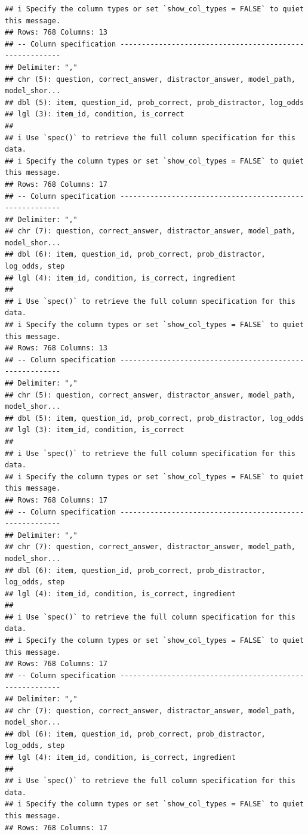 \documentclass[
]{article}
\begin{document}
\begin{verbatim}
## i Specify the column types or set `show_col_types = FALSE` to quiet this message.
## Rows: 768 Columns: 13
## -- Column specification --------------------------------------------------------
## Delimiter: ","
## chr (5): question, correct_answer, distractor_answer, model_path, model_shor...
## dbl (5): item, question_id, prob_correct, prob_distractor, log_odds
## lgl (3): item_id, condition, is_correct
## 
## i Use `spec()` to retrieve the full column specification for this data.
## i Specify the column types or set `show_col_types = FALSE` to quiet this message.
## Rows: 768 Columns: 17
## -- Column specification --------------------------------------------------------
## Delimiter: ","
## chr (7): question, correct_answer, distractor_answer, model_path, model_shor...
## dbl (6): item, question_id, prob_correct, prob_distractor, log_odds, step
## lgl (4): item_id, condition, is_correct, ingredient
## 
## i Use `spec()` to retrieve the full column specification for this data.
## i Specify the column types or set `show_col_types = FALSE` to quiet this message.
## Rows: 768 Columns: 13
## -- Column specification --------------------------------------------------------
## Delimiter: ","
## chr (5): question, correct_answer, distractor_answer, model_path, model_shor...
## dbl (5): item, question_id, prob_correct, prob_distractor, log_odds
## lgl (3): item_id, condition, is_correct
## 
## i Use `spec()` to retrieve the full column specification for this data.
## i Specify the column types or set `show_col_types = FALSE` to quiet this message.
## Rows: 768 Columns: 17
## -- Column specification --------------------------------------------------------
## Delimiter: ","
## chr (7): question, correct_answer, distractor_answer, model_path, model_shor...
## dbl (6): item, question_id, prob_correct, prob_distractor, log_odds, step
## lgl (4): item_id, condition, is_correct, ingredient
## 
## i Use `spec()` to retrieve the full column specification for this data.
## i Specify the column types or set `show_col_types = FALSE` to quiet this message.
## Rows: 768 Columns: 17
## -- Column specification --------------------------------------------------------
## Delimiter: ","
## chr (7): question, correct_answer, distractor_answer, model_path, model_shor...
## dbl (6): item, question_id, prob_correct, prob_distractor, log_odds, step
## lgl (4): item_id, condition, is_correct, ingredient
## 
## i Use `spec()` to retrieve the full column specification for this data.
## i Specify the column types or set `show_col_types = FALSE` to quiet this message.
## Rows: 768 Columns: 17

\end{verbatim}
\end{document}
